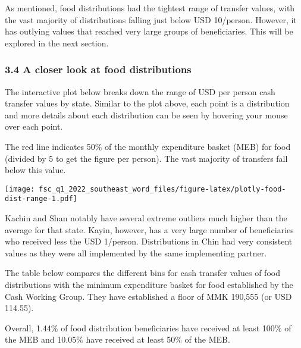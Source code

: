 \documentclass[
]{article}
\begin{document}
As mentioned, food distributions had the tightest range of transfer
values, with the vast majority of distributions falling just below USD
10/person. However, it has outlying values that reached very large
groups of beneficiaries. This will be explored in the next section.

\hypertarget{a-closer-look-at-food-distributions}{%
\subsubsection{3.4 A closer look at food
distributions}\label{a-closer-look-at-food-distributions}}

The interactive plot below breaks down the range of USD per person cash
transfer values by state. Similar to the plot above, each point is a
distribution and more details about each distribution can be seen by
hovering your mouse over each point.

The red line indicates 50\% of the monthly expenditure basket (MEB) for
food (divided by 5 to get the figure per person). The vast majority of
transfers fall below this value.

\texttt{[image: fsc\_q1\_2022\_southeast\_word\_files/figure-latex/plotly-food-dist-range-1.pdf]}

Kachin and Shan notably have several extreme outliers much higher than
the average for that state. Kayin, however, has a very large number of
beneficiaries who received less the USD 1/person. Distributions in Chin
had very consistent values as they were all implemented by the same
implementing partner.

The table below compares the different bins for cash transfer values of
food distributions with the minimum expenditure basket for food
established by the Cash Working Group. They have established a floor of
MMK 190,555 (or USD 114.55).

Overall, 1.44\% of food distribution beneficiaries have received at
least 100\% of the MEB and 10.05\% have received at least 50\% of the
MEB.
\end{document}
